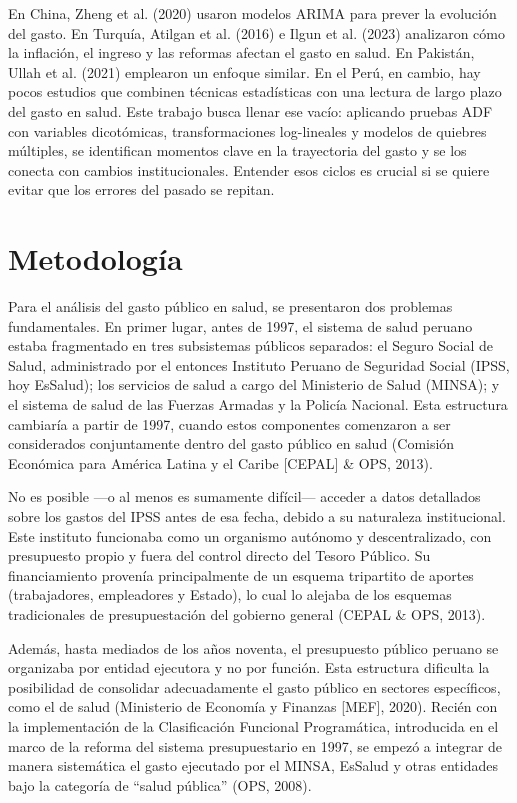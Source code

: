 \documentclass[12pt]{article}
\begin{document}
En China, Zheng et al. (2020) usaron modelos ARIMA para prever la evolución del gasto. En Turquía, Atilgan et al. (2016) e Ilgun et al. (2023) analizaron cómo la inflación, el ingreso y las reformas afectan el gasto en salud. En Pakistán, Ullah et al. (2021) emplearon un enfoque similar. En el Perú, en cambio, hay pocos estudios que combinen técnicas estadísticas con una lectura de largo plazo del gasto en salud. Este trabajo busca llenar ese vacío: aplicando pruebas ADF con variables dicotómicas, transformaciones log-lineales y modelos de quiebres múltiples, se identifican momentos clave en la trayectoria del gasto y se los conecta con cambios institucionales. Entender esos ciclos es crucial si se quiere evitar que los errores del pasado se repitan.

\bigskip
\bigskip
\bigskip
\bigskip
\bigskip
\bigskip
\bigskip
\bigskip
\bigskip
\section{Metodología}

Para el análisis del gasto público en salud, se presentaron dos problemas fundamentales. En primer lugar, antes de 1997, el sistema de salud peruano estaba fragmentado en tres subsistemas públicos separados: el Seguro Social de Salud, administrado por el entonces Instituto Peruano de Seguridad Social (IPSS, hoy EsSalud); los servicios de salud a cargo del Ministerio de Salud (MINSA); y el sistema de salud de las Fuerzas Armadas y la Policía Nacional. Esta estructura cambiaría a partir de 1997, cuando estos componentes comenzaron a ser considerados conjuntamente dentro del gasto público en salud (Comisión Económica para América Latina y el Caribe [CEPAL] \& OPS, 2013).

No es posible —o al menos es sumamente difícil— acceder a datos detallados sobre los gastos del IPSS antes de esa fecha, debido a su naturaleza institucional. Este instituto funcionaba como un organismo autónomo y descentralizado, con presupuesto propio y fuera del control directo del Tesoro Público. Su financiamiento provenía principalmente de un esquema tripartito de aportes (trabajadores, empleadores y Estado), lo cual lo alejaba de los esquemas tradicionales de presupuestación del gobierno general (CEPAL \& OPS, 2013).

Además, hasta mediados de los años noventa, el presupuesto público peruano se organizaba por entidad ejecutora y no por función. Esta estructura dificulta la posibilidad de consolidar adecuadamente el gasto público en sectores específicos, como el de salud (Ministerio de Economía y Finanzas [MEF], 2020). Recién con la implementación de la Clasificación Funcional Programática, introducida en el marco de la reforma del sistema presupuestario en 1997, se empezó a integrar de manera sistemática el gasto ejecutado por el MINSA, EsSalud y otras entidades bajo la categoría de “salud pública” (OPS, 2008).
\end{document}

